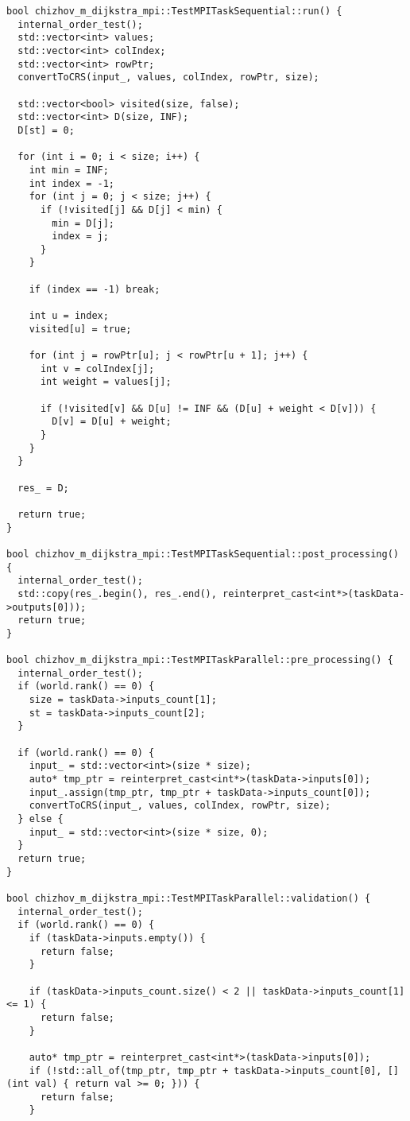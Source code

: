 \documentclass[a4paper, 14pt]{extarticle}
\begin{document}
\begin{lstlisting}
bool chizhov_m_dijkstra_mpi::TestMPITaskSequential::run() {
  internal_order_test();
  std::vector<int> values;
  std::vector<int> colIndex;
  std::vector<int> rowPtr;
  convertToCRS(input_, values, colIndex, rowPtr, size);

  std::vector<bool> visited(size, false);
  std::vector<int> D(size, INF);
  D[st] = 0;

  for (int i = 0; i < size; i++) {
    int min = INF;
    int index = -1;
    for (int j = 0; j < size; j++) {
      if (!visited[j] && D[j] < min) {
        min = D[j];
        index = j;
      }
    }

    if (index == -1) break;

    int u = index;
    visited[u] = true;

    for (int j = rowPtr[u]; j < rowPtr[u + 1]; j++) {
      int v = colIndex[j];
      int weight = values[j];

      if (!visited[v] && D[u] != INF && (D[u] + weight < D[v])) {
        D[v] = D[u] + weight;
      }
    }
  }

  res_ = D;

  return true;
}

bool chizhov_m_dijkstra_mpi::TestMPITaskSequential::post_processing() {
  internal_order_test();
  std::copy(res_.begin(), res_.end(), reinterpret_cast<int*>(taskData->outputs[0]));
  return true;
}

bool chizhov_m_dijkstra_mpi::TestMPITaskParallel::pre_processing() {
  internal_order_test();
  if (world.rank() == 0) {
    size = taskData->inputs_count[1];
    st = taskData->inputs_count[2];
  }

  if (world.rank() == 0) {
    input_ = std::vector<int>(size * size);
    auto* tmp_ptr = reinterpret_cast<int*>(taskData->inputs[0]);
    input_.assign(tmp_ptr, tmp_ptr + taskData->inputs_count[0]);
    convertToCRS(input_, values, colIndex, rowPtr, size);
  } else {
    input_ = std::vector<int>(size * size, 0);
  }
  return true;
}

bool chizhov_m_dijkstra_mpi::TestMPITaskParallel::validation() {
  internal_order_test();
  if (world.rank() == 0) {
    if (taskData->inputs.empty()) {
      return false;
    }

    if (taskData->inputs_count.size() < 2 || taskData->inputs_count[1] <= 1) {
      return false;
    }

    auto* tmp_ptr = reinterpret_cast<int*>(taskData->inputs[0]);
    if (!std::all_of(tmp_ptr, tmp_ptr + taskData->inputs_count[0], [](int val) { return val >= 0; })) {
      return false;
    }


\end{lstlisting}
\end{document}

